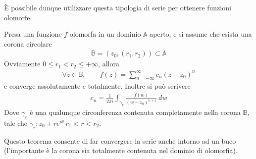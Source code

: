 \documentclass[a4paper, oneside]{article}
\begin{document}
È possibile dunque utilizzare questa tipologia di serie per ottenere
funzioni olomorfe.
\begin{theorem}
    Presa una funzione $f$ olomorfa in un dominio $\mathbb{A}$ aperto, e si assume che
    esista una corona circolare
    \begin{gather*}
        \mathbb{B} = (z_0, (r_1, r_2)) \subset \mathbb{A}
    \end{gather*}
    Ovviamente $0 \leq r_1 < r_2 \leq + \infty$, allora 
    \begin{align}
        \forall z \in \mathbb{B}, \qquad f(z) = \sum_{n = -\infty }^{\infty } c_n(z - z_0)^{n} 
    \end{align}
    e converge assolutamente e totalmente. Inoltre si può scrivere
    \begin{align}
        c_n = \frac{1}{2\pi i} \int_{\gamma_r} \frac{f(w)}{(w - z_0)^{ n + 1}} \ dw  
    \end{align}
    Dove $\gamma_r$ è una qualunque circonferenza contenuta completamente nella corona $\mathbb{B}$, 
    tale che $\gamma_r : z_0 + re^{i\theta} \ r_1 < r < r_2$.
\end{theorem}

\begin{corollary}
    Questo teorema consente di far convergere la serie anche intorno ad un buco 
    (l'importante è la corona sia totalmente contenuta nel dominio di olomorfia).
\end{corollary}
\end{document}
